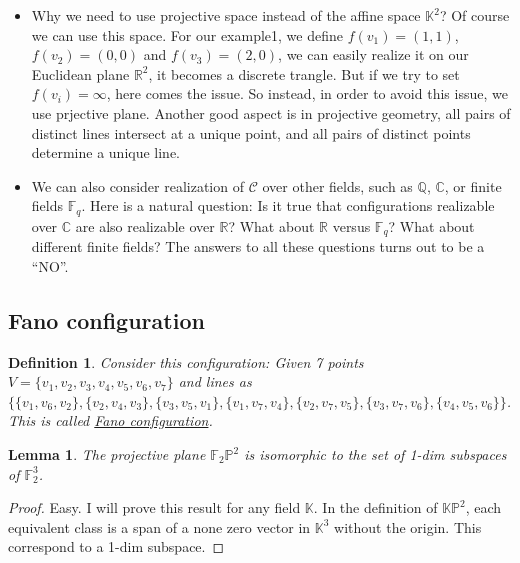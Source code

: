 \documentclass{article}
\newtheorem{definition}{Definition}[section]
\newtheorem{lemma}{Lemma}[section]
\newcommand{\Q}{\mathbb{Q}}
\newcommand{\R}{\mathbb{R}}
\newcommand{\C}{\mathbb{C}}
\begin{document}
\begin{itemize}
    \item Why we need to use projective space instead of the affine space $\mathbb{K}^2$? 
    Of course we can use this space. For our example1, we define $f(v_1)=(1,1)$, $f(v_2)=(0,0)$ and $f(v_3)=(2,0)$,
    we can easily realize it on our Euclidean plane $\R^2$, it becomes a discrete trangle. 
    But if we try to set $f(v_i)=\infty$, here comes the issue. So instead, in order to avoid this issue, we use prjective plane. Another good aspect is in projective geometry, all pairs of distinct lines intersect at a unique point, and all pairs of distinct points determine a unique line. 
    \item We can also consider realization of $\mathcal{C}$ over other fields, such as $\Q$, $\C$, or finite fields $\mathbb{F}_q$. 
    Here is a natural question: Is it true that configurations realizable over $\C$ are also realizable over $\R$? What about $\R$ versus $\mathbb{F}_q$? What about different finite fields? The answers to all these questions turns out to be a “NO”.
\end{itemize}

\subsection{Fano configuration}

\begin{definition}
    Consider this configuration: Given 7 points $V=\{v_1,v_2,v_3,v_4,v_5,v_6,v_7\}$ and lines as $\{\{v_1,v_6,v_2\},\{v_2,v_4,v_3\},\{v_3,v_5,v_1\},\{v_1,v_7,v_4\},\{v_2,v_7,v_5\},\{v_3,v_7,v_6\},\{v_4,v_5,v_6\}\}$. 
    This is called \underline{Fano configuration}.
\end{definition}

\begin{lemma}
    The projective plane $\mathbb{F}_2\mathbb{P}^2$ is isomorphic to the set of 1-dim subspaces of $\mathbb{F}_2^3$.
\end{lemma}
\begin{proof}
    Easy. I will prove this result for any field $\mathbb{K}$. In the definition of $\mathbb{K}\mathbb{P}^2$, 
    each equivalent class is a span of a none zero vector in $\mathbb{K}^{3}$ without the origin. This correspond to a 1-dim subspace.
\end{proof}
\end{document}
